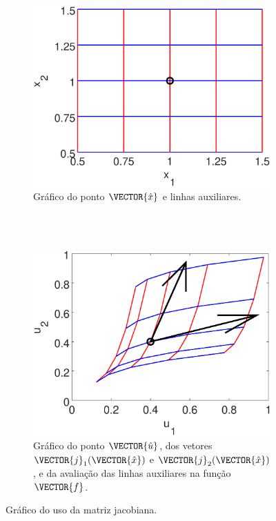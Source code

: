 \begin{figure}[!h]
    \centering
    \begin{subfigure}[b]{0.49\textwidth}
        \includegraphics[width=\textwidth]{chapters/derivada/mfiles/jacobian/jacobian1.eps}
        \caption{Gráfico do ponto $\VECTOR{\hat{x}}$ e linhas auxiliares. ~~~~~~~~~ ~~~~~~~~~ ~~~~~~~~~}
        \label{fig:ex:jacobiano:x}
    \end{subfigure}
    ~ %
    \begin{subfigure}[b]{0.49\textwidth}
        \includegraphics[width=\textwidth]{chapters/derivada/mfiles/jacobian/jacobian2.eps}
        \caption{Gráfico do ponto $\VECTOR{\hat{u}}$, dos vetores $\VECTOR{j}_{1}(\VECTOR{\hat{x}})$ e
    $\VECTOR{j}_{2}(\VECTOR{\hat{x}})$, e da avaliação das linhas auxiliares na função $\VECTOR{f}$.}
        \label{fig:ex:jacobiano:u}
    \end{subfigure}
    \caption{Gráfico do uso da matriz jacobiana.}
    \label{fig:ex:jacobiano}
\end{figure}


